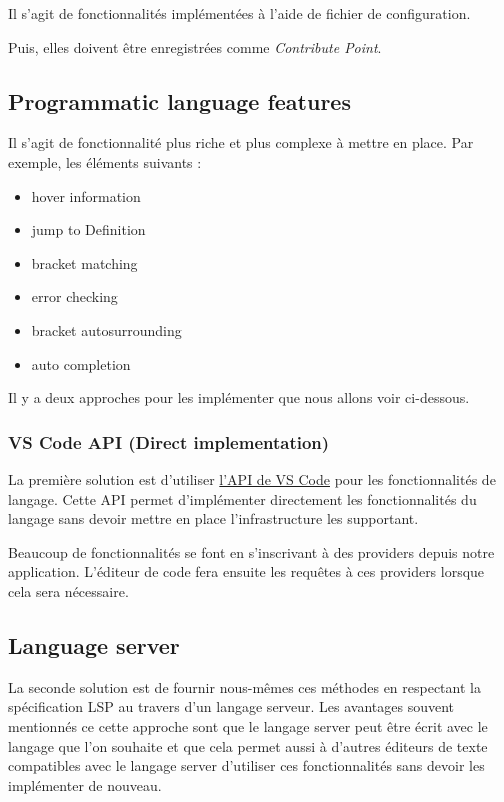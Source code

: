 \documentclass[
    iict, %
    il, %
]{heig-tb}
\begin{document}
Il s'agit de fonctionnalités implémentées à l'aide de fichier de configuration.

Puis, elles doivent être enregistrées comme \emph{Contribute Point}.

\subsection{Programmatic language features}\label{Programmatic language features}
Il s'agit de fonctionnalité plus riche et plus complexe à mettre en place.
Par exemple, les éléments suivants :

\begin{itemize}
    \item hover information
    \item jump to Definition
    \item bracket matching
    \item error checking
    \item bracket autosurrounding
    \item auto completion
\end{itemize}

Il y a deux approches pour les implémenter que nous allons voir ci-dessous.

\subsubsection{VS Code API (Direct implementation)}
La première solution est d'utiliser \href{https://code.visualstudio.com/api/references/vscode-api#languages}{l'API de VS Code} pour les fonctionnalités de langage.
Cette API permet d'implémenter directement les fonctionnalités du langage sans devoir mettre en place l'infrastructure les supportant.

Beaucoup de fonctionnalités se font en s'inscrivant à des providers depuis notre application.
L'éditeur de code fera ensuite les requêtes à ces providers lorsque cela sera nécessaire.

\subsection{Language server}

La seconde solution est de fournir nous-mêmes ces méthodes en respectant la spécification LSP \cite{lsp-specification} au travers d'un langage serveur.
Les avantages souvent mentionnés ce cette approche sont que le langage server peut être écrit avec le langage que l'on souhaite et
que cela permet aussi à d'autres éditeurs de texte compatibles avec le langage server d'utiliser ces fonctionnalités sans devoir les implémenter de nouveau.
\end{document}
